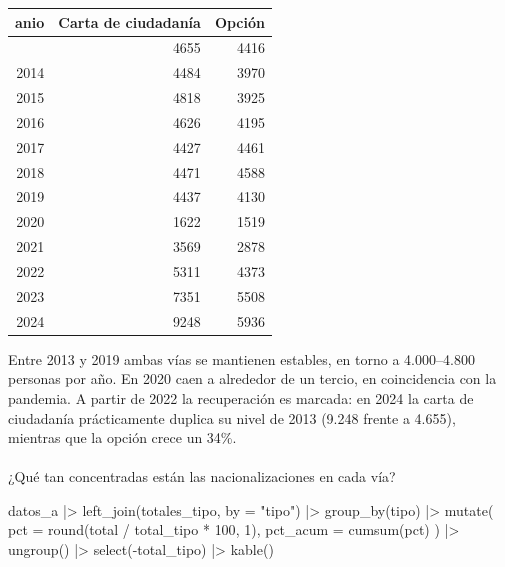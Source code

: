 \documentclass[
  letterpaper,
  DIV=11,
  numbers=noendperiod]{scrartcl}
\makeatletter
\let\oldparagraph\paragraph
\renewcommand{\paragraph}{
    \@ifstar
      \xxxParagraphStar
      \xxxParagraphNoStar
  }
\newcommand{\xxxParagraphStar}[1]{\oldparagraph*{#1}\mbox{}}
\newcommand{\xxxParagraphNoStar}[1]{\oldparagraph{#1}\mbox{}}
\newenvironment{Shaded}{\begin{snugshade}}{\end{snugshade}}
\newcommand{\AttributeTok}[1]{\textcolor[rgb]{0.40,0.45,0.13}{#1}}
\newcommand{\DecValTok}[1]{\textcolor[rgb]{0.68,0.00,0.00}{#1}}
\newcommand{\FunctionTok}[1]{\textcolor[rgb]{0.28,0.35,0.67}{#1}}
\newcommand{\NormalTok}[1]{\textcolor[rgb]{0.00,0.23,0.31}{#1}}
\newcommand{\SpecialCharTok}[1]{\textcolor[rgb]{0.37,0.37,0.37}{#1}}
\newcommand{\StringTok}[1]{\textcolor[rgb]{0.13,0.47,0.30}{#1}}
\makeatother
\begin{document}
\begin{longtable}[]{@{}rrr@{}}
\toprule\noalign{}
anio & Carta de ciudadanía & Opción \\
\midrule\noalign{}
\endhead
\bottomrule\noalign{}
\endlastfoot
2013 & 4655 & 4416 \\
2014 & 4484 & 3970 \\
2015 & 4818 & 3925 \\
2016 & 4626 & 4195 \\
2017 & 4427 & 4461 \\
2018 & 4471 & 4588 \\
2019 & 4437 & 4130 \\
2020 & 1622 & 1519 \\
2021 & 3569 & 2878 \\
2022 & 5311 & 4373 \\
2023 & 7351 & 5508 \\
2024 & 9248 & 5936 \\
\end{longtable}

Entre 2013 y 2019 ambas vías se mantienen estables, en torno a
4.000--4.800 personas por año. En 2020 caen a alrededor de un tercio, en
coincidencia con la pandemia. A partir de 2022 la recuperación es
marcada: en 2024 la carta de ciudadanía prácticamente duplica su nivel
de 2013 (9.248 frente a 4.655), mientras que la opción crece un 34\%.

\paragraph{¿Qué tan concentradas están las nacionalizaciones en cada
vía?}\label{quuxe9-tan-concentradas-estuxe1n-las-nacionalizaciones-en-cada-vuxeda}

\begin{Shaded}
\begin{Highlighting}[]
\NormalTok{datos\_a }\SpecialCharTok{|\textgreater{}}
  \FunctionTok{left\_join}\NormalTok{(totales\_tipo, }\AttributeTok{by =} \StringTok{"tipo"}\NormalTok{) }\SpecialCharTok{|\textgreater{}}
  \FunctionTok{group\_by}\NormalTok{(tipo) }\SpecialCharTok{|\textgreater{}}
  \FunctionTok{mutate}\NormalTok{(}
    \AttributeTok{pct      =} \FunctionTok{round}\NormalTok{(total }\SpecialCharTok{/}\NormalTok{ total\_tipo }\SpecialCharTok{*} \DecValTok{100}\NormalTok{, }\DecValTok{1}\NormalTok{),}
    \AttributeTok{pct\_acum =} \FunctionTok{cumsum}\NormalTok{(pct)}
\NormalTok{  ) }\SpecialCharTok{|\textgreater{}}
  \FunctionTok{ungroup}\NormalTok{() }\SpecialCharTok{|\textgreater{}}
  \FunctionTok{select}\NormalTok{(}\SpecialCharTok{{-}}\NormalTok{total\_tipo) }\SpecialCharTok{|\textgreater{}} 
  \FunctionTok{kable}\NormalTok{()}
\end{Highlighting}
\end{Shaded}
\end{document}
